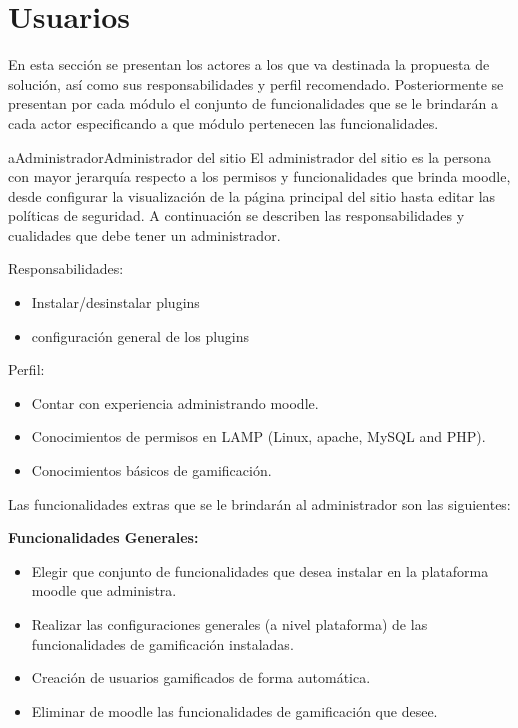 \section{Usuarios}
\label{analisis:usuarios}

 En esta sección se presentan los actores a los que va destinada la propuesta de
 solución, así como sus responsabilidades y perfil recomendado. Posteriormente se
 presentan por cada módulo el conjunto de funcionalidades que se le brindarán a
 cada actor especificando a que módulo pertenecen las funcionalidades.


    \begin{actor}{aAdministrador}{Administrador del sitio}{%
    El administrador del sitio es la persona con mayor jerarquía respecto a los
    permisos y funcionalidades que brinda moodle, desde configurar la visualización
    de la página principal del sitio hasta editar las políticas de seguridad. A
    continuación se describen las responsabilidades y cualidades que debe tener
    un administrador.\\}

    \item[Responsabilidades:] \hfill
        \begin{itemize}
        \item Instalar/desinstalar plugins
        \item configuración general de los plugins
        \end{itemize}

    \item[Perfil:] \hfill
        \begin{itemize}
        \item Contar con experiencia administrando moodle.
        \item Conocimientos de permisos en LAMP (Linux, apache, MySQL and PHP).
        \item Conocimientos básicos de gamificación.\\
        \end{itemize}
    \end{actor}

    \noindent
    Las funcionalidades extras que se le brindarán al administrador son las siguientes:


    {\bf Funcionalidades Generales:}
        \begin{itemize}
        \item Elegir que conjunto de funcionalidades que desea instalar
              en la plataforma moodle que administra.
        \item Realizar las configuraciones generales (a nivel plataforma) de las
              funcionalidades de gamificación instaladas.
        \item Creación de usuarios gamificados de forma automática.
        \item Eliminar de moodle las funcionalidades de gamificación que desee.
        \end{itemize}

